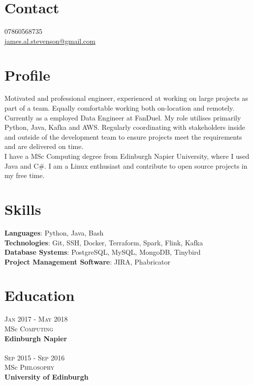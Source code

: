 \documentclass[14pt, a4paper]{extarticle}
\begin{document}
\par{\bigskip\par
\section{Contact}
\large
07860568735\\
\href{mailto:james.al.stevenson@gmail.com}{james.al.stevenson@gmail.com}\\
}

\begin{multicols}{2}

\section{Profile}
\noindent Motivated and professional engineer, experienced at working on large projects as part of a team. Equally comfortable working both on-location and remotely.\\
Currently as a employed Data Engineer at FanDuel. My role utilises primarily Python, Java, Kafka and AWS. Regularly coordinating with stakeholders inside and outside of the development team to ensure projects meet the requirements and are delivered on time.\\
I have a MSc Computing degree from Edinburgh Napier University, where I used Java and C\#. I am a Linux enthusiast and contribute to open source projects in my free time.

\section{Skills}
\noindent\textbf{Languages}: Python, Java, Bash\\
\textbf{Technologies}: Git, SSH, Docker, Terraform, Spark, Flink, Kafka\\
\textbf{Database Systems}: PostgreSQL, MySQL, MongoDB, Tinybird\\
\textbf{Project Management Software}: JIRA, Phabricator\\

\section{Education}
\noindent\textsc{Jan} 2017 - \textsc{May} 2018\\
MSc \textsc{Computing} \\
\textbf{Edinburgh Napier}\\~\\
\textsc{Sep} 2015 - \textsc{Sep} 2016\\
MSc \textsc{Philosophy} \\
\textbf{University of Edinburgh}


\end{multicols}
\end{document}
